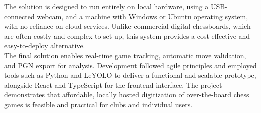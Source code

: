 The solution is designed to run entirely on local hardware, using a USB-connected webcam, and a machine with Windows or Ubuntu operating system, with no reliance on cloud services. Unlike commercial digital chessboards, which are often costly and complex to set up, this system provides a cost-effective and easy-to-deploy alternative. \\

The final solution enables real-time game tracking, automatic move validation, and PGN export for analysis. Development followed agile principles and employed tools such as Python and LeYOLO to deliver a functional and scalable prototype, alongside React and TypeScript for the frontend interface. The project demonstrates that affordable, locally hosted digitization of over-the-board chess games is feasible and practical for clubs and individual users.